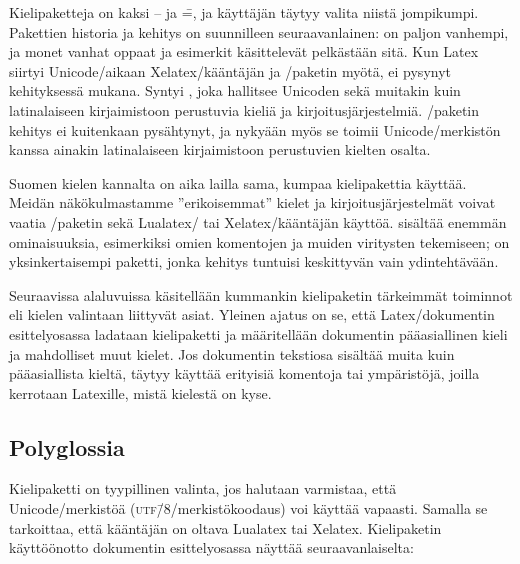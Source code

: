 Kielipaketteja on kaksi --  ja
 \==, ja käyttäjän täytyy
valita niistä jompikumpi. Pakettien historia ja kehitys on suunnilleen
seuraavanlainen:  on paljon vanhempi, ja monet vanhat
oppaat ja esimerkit käsittelevät pelkästään sitä. Kun Latex siirtyi
Unicode\-/aikaan Xelatex\-/kääntäjän ja \-/paketin
myötä,  ei pysynyt kehityksessä mukana. Syntyi
, joka hallitsee Unicoden sekä muitakin kuin
latinalaiseen kirjaimistoon perustuvia kieliä ja kirjoitusjärjestelmiä.
\-/paketin kehitys ei kuitenkaan pysähtynyt, ja nykyään
myös se toimii Unicode\-/merkistön kanssa ainakin latinalaiseen
kirjaimistoon perustuvien kielten osalta.

Suomen kielen kannalta on aika lailla sama, kumpaa kielipakettia
käyttää. Meidän näkökulmastamme ''erikoisemmat'' kielet ja
kirjoitusjärjestelmät voivat vaatia \-/paketin sekä
Lualatex\-/{} tai Xelatex\-/kääntäjän käyttöä.  sisältää
enemmän ominaisuuksia, esimerkiksi omien komentojen ja muiden viritysten
tekemiseen;  on yksinkertaisempi paketti, jonka
kehitys tuntuisi keskittyvän vain ydintehtävään.

Seuraavissa alaluvuissa käsitellään kummankin kielipaketin tärkeimmät
toiminnot eli kielen valintaan liittyvät asiat. Yleinen ajatus on se,
että Latex\-/dokumentin esittelyosassa ladataan kielipaketti ja
määritellään dokumentin pääasiallinen kieli ja mahdolliset muut kielet.
Jos dokumentin tekstiosa sisältää muita kuin pääasiallista kieltä,
täytyy käyttää erityisiä komentoja tai ympäristöjä, joilla kerrotaan
Latexille, mistä kielestä on kyse.

\subsection{Polyglossia}

Kielipaketti  on tyypillinen valinta, jos halutaan
varmistaa, että Unicode\-/merkistöä (\textsc{utf\=/8}\-/merkistökoodaus)
voi käyttää vapaasti. Samalla se tarkoittaa, että kääntäjän on oltava
Lualatex tai Xelatex. Kielipaketin käyttöönotto dokumentin
esittelyosassa näyttää seuraavanlaiselta:

\begin{koodilohkosis}
  \usepackage{polyglossia}
  \setdefaultlanguage{finnish}
\end{koodilohkosis}

